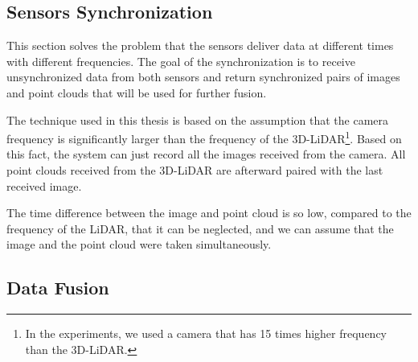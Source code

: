 \subsection{Sensors Synchronization}

This section solves the problem that the sensors deliver data at different times with different frequencies. The goal of the synchronization is to receive unsynchronized data from both sensors and return synchronized pairs of images and point clouds that will be used for further fusion.\par
The technique used in this thesis is based on the assumption that the camera frequency is significantly larger than the frequency of the 3D-LiDAR\footnote{In the experiments, we used a camera that has 15 times higher frequency than the 3D-LiDAR.}. Based on this fact, the system can just record all the images received from the camera. All point clouds received from the 3D-LiDAR are afterward paired with the last received image.\par
The time difference between the image and point cloud is so low, compared to the frequency of the LiDAR, that it can be neglected, and we can assume that the image and the point cloud were taken simultaneously.

\subsection{Data Fusion}

